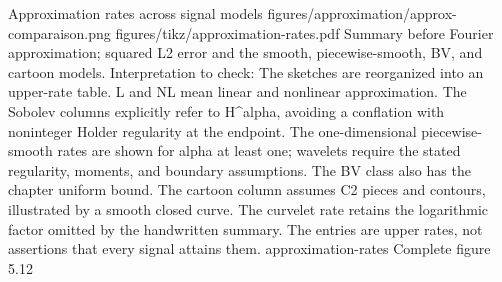 {Approximation rates across signal models}
{figures/approximation/approx-comparaison.png}
{figures/tikz/approximation-rates.pdf}
{Summary before Fourier approximation; squared L2 error and the smooth, piecewise-smooth, BV, and cartoon models.}
{Interpretation to check: The sketches are reorganized into an upper-rate table. L and NL mean linear and nonlinear approximation. The Sobolev columns explicitly refer to H\textasciicircum{}alpha, avoiding a conflation with noninteger Holder regularity at the endpoint. The one-dimensional piecewise-smooth rates are shown for alpha at least one; wavelets require the stated regularity, moments, and boundary assumptions. The BV class also has the chapter uniform bound. The cartoon column assumes C2 pieces and contours, illustrated by a smooth closed curve. The curvelet rate retains the logarithmic factor omitted by the handwritten summary. The entries are upper rates, not assertions that every signal attains them.}
{approximation-rates}
{Complete figure}
{5.12}
